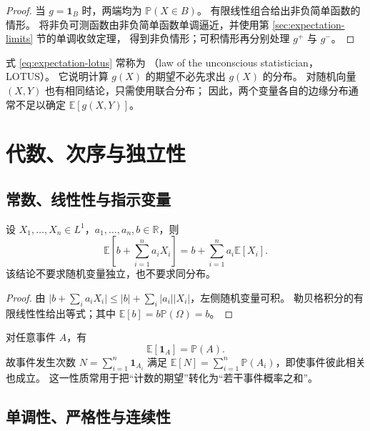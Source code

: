 \documentclass[UTF8]{ctexart}
\begin{document}
\begin{proof}
当 $g=\mathbf1_B$ 时，两端均为 $\mathbb P(X\in B)$。
有限线性组合给出非负简单函数的情形。
将非负可测函数由非负简单函数单调逼近，并使用第 \ref{sec:expectation-limits} 节的单调收敛定理，
得到非负情形；可积情形再分别处理 $g^+$ 与 $g^-$。
\end{proof}

式 \eqref{eq:expectation-lotus} 常称为
（law of the unconscious statistician，LOTUS）。
它说明计算 $g(X)$ 的期望不必先求出 $g(X)$ 的分布。
对随机向量 $(X,Y)$ 也有相同结论，只需使用联合分布；
因此，两个变量各自的边缘分布通常不足以确定 $\mathbb E[g(X,Y)]$。

\section{代数、次序与独立性}
\label{sec:expectation-algebra}

\subsection{常数、线性性与指示变量}

\begin{proposition}[有限线性性]
\label{prop:expectation-linearity}
设 $X_1,\ldots,X_n\in L^1$，$a_1,\ldots,a_n,b\in\mathbb R$，则
\begin{equation}
  \mathbb E\!\left[b+\sum_{i=1}^n a_iX_i\right]
  =b+\sum_{i=1}^n a_i\mathbb E[X_i].
  \label{eq:expectation-linearity}
\end{equation}
该结论不要求随机变量独立，也不要求同分布。
\end{proposition}

\begin{proof}
由 $\bigl|b+\sum_i a_iX_i\bigr|\leq |b|+\sum_i|a_i||X_i|$，左侧随机变量可积。
勒贝格积分的有限线性性给出等式；其中 $\mathbb E[b]=b\mathbb P(\Omega)=b$。
\end{proof}

对任意事件 $A$，有
\begin{equation}
  \mathbb E[\mathbf1_A]=\mathbb P(A).
  \label{eq:expectation-indicator}
\end{equation}
故事件发生次数 $N=\sum_{i=1}^n\mathbf1_{A_i}$ 满足
$\mathbb E[N]=\sum_{i=1}^n\mathbb P(A_i)$，即使事件彼此相关也成立。
这一性质常用于把“计数的期望”转化为“若干事件概率之和”。

\subsection{单调性、严格性与连续性}
\end{document}
